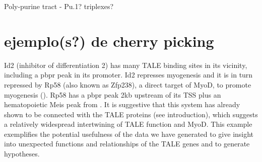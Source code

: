 

Poly-purine tract - Pu.1? triplexes?

\section{ejemplo(s?) de cherry picking}

Id2 (inhibitor of differentiation 2) has many \ac{TALE} binding sites in its vicinity, including a \ac{pbpr} peak in its promoter. Id2 represses myogenesis and it is in turn repressed by Rp58 (also known as Zfp238), a direct target of MyoD, to promote myogenesis (\cite{Yokoyama2009}). Rp58 has a \ac{pbpr} peak 2kb upstream of its TSS plus an hematopoietic Meis peak from \cite{Wilson2010}. It is suggestive that this system has already shown to be connected with the \ac{TALE} proteins (see introduction), which suggests a relatively widespread intertwining of \ac{TALE} function and MyoD. This example exemplifies the potential usefulness of the data we have generated to give insight into unexpected functions and relationships of the \ac{TALE} genes and to generate hypotheses. 

